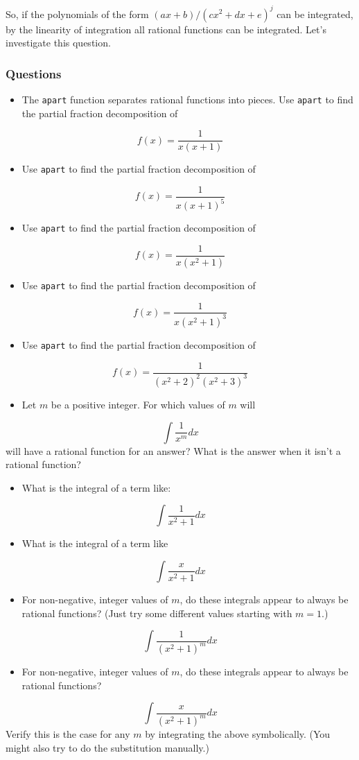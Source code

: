 \documentclass[12pt]{article}
\begin{document}
So, if the polynomials of the form $(ax+b)/(cx^2 + dx + e)^j$ can be integrated, by the linearity of integration all rational functions can be integrated. Let's investigate this question.\subsubsection{Questions}\begin{itemize}\item The \texttt{apart} function separates rational functions into pieces. Use   \texttt{apart} to find the partial fraction decomposition of\end{itemize}
$$
f(x) = \frac{1}{x(x+1)}
$$
\begin{itemize}\item  Use \texttt{apart} to find the partial fraction decomposition of \end{itemize}
$$
f(x) = \frac{1}{x(x+1)^5}
$$
\begin{itemize}\item  Use \texttt{apart} to find the partial fraction decomposition of \end{itemize}
$$
f(x) = \frac{1}{x(x^2+1)}
$$
\begin{itemize}\item  Use \texttt{apart} to find the partial fraction decomposition of \end{itemize}
$$
f(x) = \frac{1}{x(x^2+1)^3}
$$
\begin{itemize}\item  Use \texttt{apart} to find the partial fraction decomposition of \end{itemize}
$$
f(x) = \frac{1}{(x^2+2)^2 (x^2+3)^3}
$$
\begin{itemize}\item Let $m$ be a positive integer. For which values of $m$ will \end{itemize}
$$
\int \frac{1}{x^m} dx
$$
\newline
will have a rational function for an answer? What is the answer when it isn't a rational function?\begin{itemize}\item What is the integral of a term like:\end{itemize}
$$
\int \frac{1}{x^2 + 1} dx
$$
\begin{itemize}\item What is the integral of a term like\end{itemize}
$$
\int \frac{x}{x^2 + 1} dx
$$
\begin{itemize}\item For non-negative, integer values of $m$, do these integrals appear   to always be rational functions? (Just try some different values   starting with $m=1$.)\end{itemize}
$$
\int \frac{1}{(x^2+1)^m} dx
$$
\begin{itemize}\item For non-negative, integer values of $m$, do these integrals appear   to always be rational functions?\end{itemize}
$$
\int \frac{x}{(x^2+1)^m} dx
$$
\newline
Verify this is the case for any $m$ by integrating the above symbolically. (You might also try to do the substitution manually.)
\end{document}
